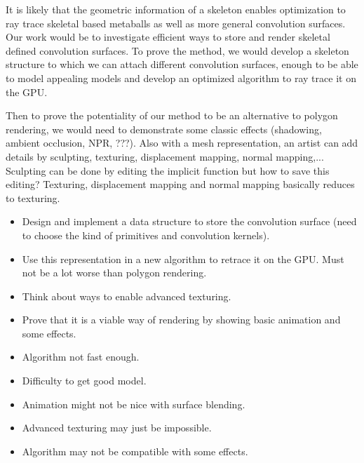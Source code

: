 \documentclass[11pt]{article}
\numberwithin{figure}{section}
\begin{document}
It is likely that the geometric information of a skeleton enables optimization to ray trace skeletal based metaballs as well as more general convolution surfaces.
Our work would be to investigate efficient ways to store and render skeletal defined convolution surfaces.
To prove the method, we would develop a skeleton structure to which we can attach different convolution surfaces, enough to be able to model appealing models and develop an optimized algorithm to ray trace it on the GPU.

Then to prove the potentiality of our method to be an alternative to polygon rendering, we would need to demonstrate some classic effects (shadowing, ambient occlusion, NPR, ???). 
Also with a mesh representation, an artist can add details by sculpting, texturing, displacement mapping, normal mapping,...
Sculpting can be done by editing the implicit function but how to save this editing?
Texturing, displacement mapping and normal mapping basically reduces to texturing. 

\begin{itemize}
\item{}
Design and implement a data structure to store the convolution surface (need to choose the kind of primitives and convolution kernels).
\item{}
Use this representation in a new algorithm to retrace it on the GPU. Must not be a lot worse than polygon rendering.
\item{}
Think about ways to enable advanced texturing.
\item{}
Prove that it is a viable way of rendering by showing basic animation and some effects.
\end{itemize}

\begin{itemize}
\item{}
Algorithm not fast enough.
\item{}
Difficulty to get good model.
\item{}
Animation might not be nice with surface blending.
\item{}
Advanced texturing may just be impossible.
\item{}
Algorithm may not be compatible with some effects.
\end{itemize}
\end{document}

